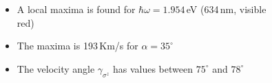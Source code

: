 \documentclass{beamer}
\begin{document}


\begin{frame}

\begin{columns}


{\small

\begin{itemize}

\item 
A local maxima is found for $\hbar \omega = 1.954$\,eV (634\,nm, visible
red)

\item 
The maxima is 193\,Km/s for $\alpha = 35^{\circ}$

\item 
The velocity angle $\gamma_{\sigma^{z}}$ has values between $75^{\circ}$
and $78^{\circ}$

\end{itemize}

}

\vspace{-6mm}
\begin{center}

\begin{figure}[h!]
\end{figure}
\end{center}
\end{columns}
\end{frame}
\end{document}
